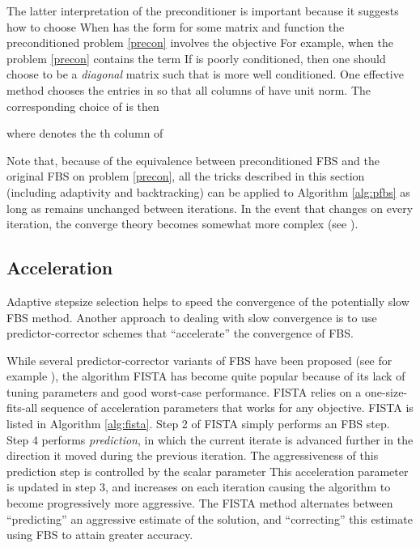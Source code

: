 \documentclass{amsart}
\theoremstyle{definition}
\begin{document}
   The latter interpretation of the preconditioner is important because it suggests how to choose   When  has the form 
for some matrix  and function   the preconditioned problem \eqref{precon} involves the objective   For example, when  the problem \eqref{precon} contains the term   If  is poorly conditioned, then one should choose  to be a {\em diagonal} matrix such that  is more well conditioned.  One effective method chooses the entries in  so that all columns of  have unit norm.  The corresponding choice of  is then
   
  where  denotes the th column of 
  
    Note that, because of the equivalence between preconditioned FBS and the original FBS on problem \eqref{precon},  all the tricks described in this section (including adaptivity and backtracking) can be applied to Algorithm \ref{alg:pfbs} as long as  remains unchanged between iterations.  In the event that  changes on every iteration, the converge theory becomes somewhat more complex (see \cite{CP11}). 

\subsection{Acceleration} \label{sec:fista}
Adaptive stepsize selection helps to speed the convergence of the potentially slow FBS method.  Another approach to dealing with slow convergence is to use predictor-corrector schemes that ``accelerate'' the convergence of FBS.
 
While several predictor-corrector variants of FBS have been proposed (see for example \cite{BF07_twist}), the algorithm FISTA has become quite popular because of its lack of tuning parameters and good worst-case performance.   FISTA relies on a one-size-fits-all sequence of acceleration parameters that works for any objective.   FISTA is listed in Algorithm \ref{alg:fista}.  Step 2 of FISTA simply performs an FBS step.  Step 4 performs {\em prediction}, in which the current iterate is advanced further in the direction it moved during the previous iteration.  The aggressiveness of this prediction step is controlled by the scalar parameter   This acceleration parameter is updated in step 3, and increases on each iteration causing the algorithm to become progressively more aggressive.  The FISTA method alternates between ``predicting'' an aggressive estimate of the solution, and ``correcting'' this estimate using FBS to attain greater accuracy.
\end{document}
